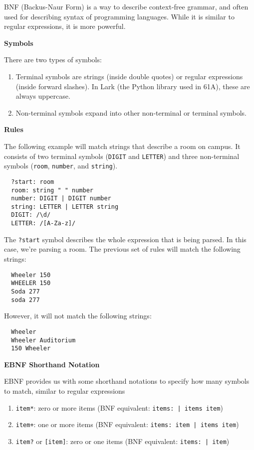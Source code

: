 BNF (Backus-Naur Form) is a way to describe context-free grammar, and often used for describing syntax of programming languages. While it is similar to regular expressions, it is more powerful.

\textbf{Symbols}

There are two types of symbols:
\begin{enumerate}
  \item Terminal symbols are strings (inside double quotes) or regular expressions (inside forward slashes). In Lark (the Python library used in 61A), these are always uppercase.
  \item Non-terminal symbols expand into other non-terminal or terminal symbols.
\end{enumerate}

\textbf{Rules}

The following example will match strings that describe a room on campus. It consists of two terminal symbols (\lstinline{DIGIT} and \lstinline{LETTER}) and three non-terminal symbols (\lstinline{room}, \lstinline{number}, and \lstinline{string}).
\begin{lstlisting}
  ?start: room
  room: string " " number
  number: DIGIT | DIGIT number
  string: LETTER | LETTER string
  DIGIT: /\d/
  LETTER: /[A-Za-z]/
\end{lstlisting}
The \lstinline{?start} symbol describes the whole expression that is being parsed. In this case, we're parsing a room. The previous set of rules will match the following strings:
\begin{lstlisting}
  Wheeler 150
  WHEELER 150
  Soda 277
  soda 277
\end{lstlisting}
However, it will not match the following strings:
\begin{lstlisting}
  Wheeler
  Wheeler Auditorium
  150 Wheeler
\end{lstlisting}

\textbf{EBNF Shorthand Notation}

EBNF provides us with some shorthand notations to specify how many symbols to match, similar to regular expressions
\begin{enumerate}
  \item \lstinline{item*}: zero or more items (BNF equivalent: \lstinline{items: | items item})
  \item \lstinline{item+}: one or more items (BNF equivalent: \lstinline{items: item | items item})
  \item \lstinline{item?} or \lstinline{[item]}: zero or one items (BNF equivalent: \lstinline{items: | item})
\end{enumerate}

